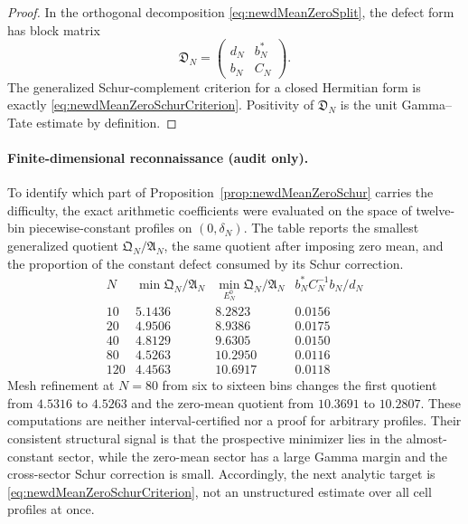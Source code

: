 \documentclass[11pt]{amsart}
\theoremstyle{definition}
\theoremstyle{remark}
\begin{document}
\begin{proof}
In the orthogonal decomposition \eqref{eq:newdMeanZeroSplit}, the defect
form has block matrix
\[
 \mathfrak D_N=
 \begin{pmatrix}d_N&b_N^*\\ b_N&C_N\end{pmatrix}.
\]
The generalized Schur-complement criterion for a closed Hermitian form is
exactly \eqref{eq:newdMeanZeroSchurCriterion}.  Positivity of
$\mathfrak D_N$ is the unit Gamma--Tate estimate by definition.
\end{proof}

\paragraph{Finite-dimensional reconnaissance (audit only).}
To identify which part of Proposition~\ref{prop:newdMeanZeroSchur} carries
the difficulty, the exact arithmetic coefficients were evaluated on the
space of twelve-bin piecewise-constant profiles on $(0,\delta_N)$.  The
table reports the smallest generalized quotient
$\mathfrak Q_N/\mathfrak A_N$, the same quotient after imposing zero mean,
and the proportion of the constant defect consumed by its Schur correction.
\[
\begin{array}{c|c|c|c}
N&\min \mathfrak Q_N/\mathfrak A_N&
\min_{E_N^0}\mathfrak Q_N/\mathfrak A_N&
b_N^*C_N^{-1}b_N/d_N\\ \hline
10 &5.1436&8.2823&0.0156\\
20 &4.9506&8.9386&0.0175\\
40 &4.8129&9.6305&0.0150\\
80 &4.5263&10.2950&0.0116\\
120&4.4563&10.6917&0.0118
\end{array}
\]
Mesh refinement at $N=80$ from six to sixteen bins changes the first
quotient from $4.5316$ to $4.5263$ and the zero-mean quotient from
$10.3691$ to $10.2807$.  These computations are neither interval-certified
nor a proof for arbitrary profiles.  Their consistent structural signal is
that the prospective minimizer lies in the almost-constant sector, while
the zero-mean sector has a large Gamma margin and the cross-sector Schur
correction is small.  Accordingly, the next analytic target is
\eqref{eq:newdMeanZeroSchurCriterion}, not an unstructured estimate over
all cell profiles at once.
\end{document}
